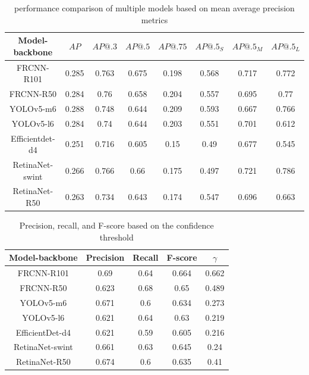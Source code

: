 \begin{table}[H]
    \begin{tabular}{|c|c|c|c|c|c|c|c|}
        \hline
        Model-backbone  & $AP$  & $AP@.3$ & $AP@.5$ & $AP@.75$ & $AP@.5_S$ & $AP@.5_M$ & $AP@.5_L$ \\ \hline
        FRCNN-R101      & 0.285 & 0.763   & 0.675   & 0.198    & 0.568     & 0.717     & 0.772     \\ \hline
        FRCNN-R50       & 0.284 & 0.76    & 0.658   & 0.204    & 0.557     & 0.695     & 0.77      \\ \hline
        YOLOv5-m6       & 0.288 & 0.748   & 0.644   & 0.209    & 0.593     & 0.667     & 0.766     \\ \hline
        YOLOv5-l6       & 0.284 & 0.74    & 0.644   & 0.203    & 0.551     & 0.701     & 0.612     \\ \hline
        Efficientdet-d4 & 0.251 & 0.716   & 0.605   & 0.15     & 0.49      & 0.677     & 0.545     \\ \hline
        RetinaNet-swint & 0.266 & 0.766   & 0.66    & 0.175    & 0.497     & 0.721     & 0.786     \\ \hline
        RetinaNet-R50   & 0.263 & 0.734   & 0.643   & 0.174    & 0.547     & 0.696     & 0.663     \\ \hline
    \end{tabular}
    \caption{performance comparison of multiple models based on mean average precision metrics}
    \label{tab:model_results:stage_four}
\end{table}

\begin{table}[H]
    \begin{tabular}{|c||c|c|c|c|}
        \hline
        Model-backbone  & Precision & Recall & F-score & $\gamma$ \\ \hline
        FRCNN-R101      & 0.69      & 0.64   & 0.664   & 0.662    \\ \hline
        FRCNN-R50       & 0.623     & 0.68   & 0.65    & 0.489    \\ \hline
        YOLOv5-m6       & 0.671     & 0.6    & 0.634   & 0.273    \\ \hline
        YOLOv5-l6       & 0.621     & 0.64   & 0.63    & 0.219    \\ \hline
        EfficientDet-d4 & 0.621     & 0.59   & 0.605   & 0.216    \\ \hline
        RetinaNet-swint & 0.661     & 0.63   & 0.645   & 0.24     \\ \hline
        RetinaNet-R50   & 0.674     & 0.6    & 0.635   & 0.41     \\ \hline
    \end{tabular}
    \caption{Precision, recall, and F-score based on the confidence threshold}
    \label{tab:model_prf:stage_four}
\end{table}

